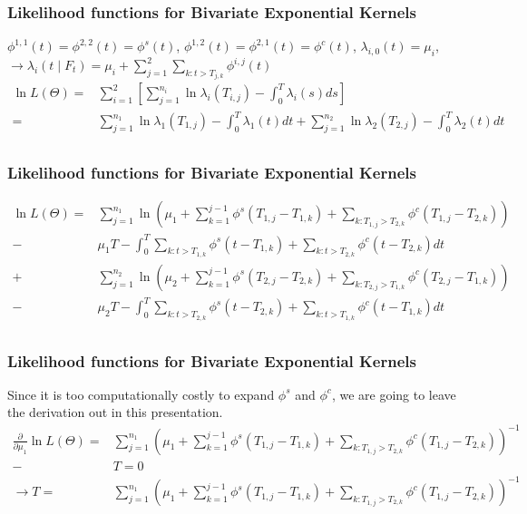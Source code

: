 \documentclass{beamer}
\begin{document}
\begin{frame}
\frametitle{Likelihood functions for Bivariate Exponential Kernels}
$\phi^{1,1}(t) = \phi^{2,2}(t) = \phi^s(t)$, $\phi^{1,2}(t) = \phi^{2,1}(t) = \phi^c(t)$, $\lambda_{i,0}(t) = \mu_i $, $\to \lambda_i(t \mid F_{t}) = \mu_i + \sum_{j=1}^2 \sum_{k: t>T_{j,k}} \phi^{i,j}(t)$
\begin{equation*}
\begin{split}
\ln L(\Theta) = & \sum_{i=1}^2 \left[ \sum_{j=1}^{n_i} \ln \lambda_i(T_{i,j})  -\int_{0}^{T} \lambda_i(s) ds \right]\\
= & \sum_{j=1}^{n_1} \ln \lambda_1(T_{1,j})  -\int_{0}^{T} \lambda_1(t) dt +\sum_{j=1}^{n_2} \ln \lambda_2(T_{2,j})  -\int_{0}^{T} \lambda_2(t) dt\\
\end{split}
\end{equation*}
\end{frame}

\begin{frame}
\frametitle{Likelihood functions for Bivariate Exponential Kernels}
\begin{equation*}
\begin{split}
\ln L(\Theta) = & \sum_{j=1}^{n_1} \ln \left(\mu_1 + \sum_{k=1}^{j-1} \phi^s(T_{1,j} - T_{1,k}) + \sum_{k: T_{1,j}>T_{2,k}} \phi^{c}(T_{1,j} - T_{2,k}) \right) \\
- &\mu_1 T - \int_{0}^{T} \sum_{k: t>T_{1,k}} \phi^s(t - T_{1,k}) + \sum_{k: t>T_{2,k}} \phi^{c}(t - T_{2,k}) dt \\
+&\sum_{j=1}^{n_2} \ln \left(\mu_2 + \sum_{k=1}^{j-1} \phi^s(T_{2,j} - T_{2,k}) + \sum_{k: T_{2,j}>T_{1,k}} \phi^{c}(T_{2,j} - T_{1,k}) \right) \\
- & \mu_2 T - \int_{0}^{T} \sum_{k: t>T_{2,k}} \phi^s(t - T_{2,k}) + \sum_{k: t>T_{1,k}} \phi^{c}(t - T_{1,k}) dt\\
\end{split}
\end{equation*}
\end{frame}

\begin{frame}
\frametitle{Likelihood functions for Bivariate Exponential Kernels}
Since it is too computationally costly to expand $\phi^s$ and $\phi^c$, we are going to leave the derivation out in this presentation.
\begin{equation*}
\begin{split}
\frac{\partial}{\partial \mu_1} \ln L(\Theta) = & \sum_{j=1}^{n_1} \left(\mu_1 + \sum_{k=1}^{j-1} \phi^s(T_{1,j} - T_{1,k}) + \sum_{k: T_{1,j}>T_{2,k}} \phi^{c}(T_{1,j} - T_{2,k}) \right)^{-1} \\
- & T = 0\\
\to T = &\sum_{j=1}^{n_1} \left(\mu_1 + \sum_{k=1}^{j-1} \phi^s(T_{1,j} - T_{1,k}) + \sum_{k: T_{1,j}>T_{2,k}} \phi^{c}(T_{1,j} - T_{2,k}) \right)^{-1}
\end{split}
\end{equation*}
\end{frame}
\end{document}
